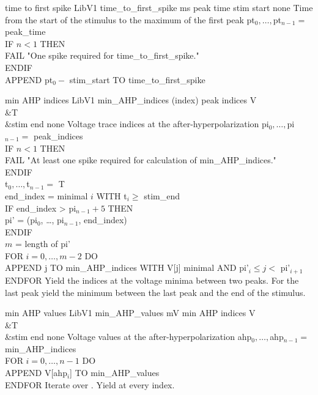 \begin{efeature}
  {time to first spike}
  {LibV1}
  {time\_to\_first\_spike}
  {ms}
  {peak time}
  {stim start}
  {none}
  {Time from the start of the stimulus to the maximum of the first peak}
  { 
  pt$_0, \ldots, $pt$_{n-1} =$ peak\_time \\
  IF $n < 1$ THEN \+ \\
    FAIL "One spike required for time\_to\_first\_spike." \- \\
  ENDIF \\
  APPEND pt$_0 -$ stim\_start TO time\_to\_first\_spike
  }
  
\end{efeature}

\begin{efeature}
  {min AHP indices}
  {LibV1}
  {min\_AHP\_indices}
  {(index)}
  {peak indices}
  {V\\&T\\&stim end}
  {none}
  {Voltage trace indices at the after-hyperpolarization}
  {
  pi$_0, \ldots, $pi$_{n-1} =$ peak\_indices \\
  IF $n < 1$ THEN \+ \\
    FAIL "At least one spike required for calculation of min\_AHP\_indices." \- \\
  ENDIF \\
  t$_0, \ldots, $t$_{n-1} =$ T \\ 
  end\_index = minimal $i$ WITH t$_i \ge$ stim\_end \\
  IF end\_index > pi$_{n-1} + 5$ THEN \+ \\
    pi' = (pi$_0$, \ldots, pi$_{n-1}$, end\_index) \- \\
  ENDIF \\
  $m$ = length of pi' \\
  FOR $i = 0, \dots, m - 2$ DO \+ \\
    APPEND j TO min\_AHP\_indices  WITH V[j] minimal AND pi'$_i \le j <$ pi'$_{i+1}$ \- \\
  ENDFOR
  }
  Yield the indices at the voltage minima between two peaks.
  For the last peak yield the minimum between the last peak and the end of the stimulus. 
  
\end{efeature}

\begin{efeature}
  {min AHP values}
  {LibV1}
  {min\_AHP\_values}
  {mV}
  {min AHP indices}
  {V\\&T\\&stim end}
  {none}
  {Voltage values at the after-hyperpolarization}
  {
  ahp$_0, \ldots, $ahp$_{n-1} =$ min\_AHP\_indices \\
  FOR $i = 0, \dots, n - 1$ DO \+ \\
    APPEND V[ahp$_i$] TO min\_AHP\_values \- \\
  ENDFOR
  }
  Iterate over .
  Yield  at every index.
  
\end{efeature}

